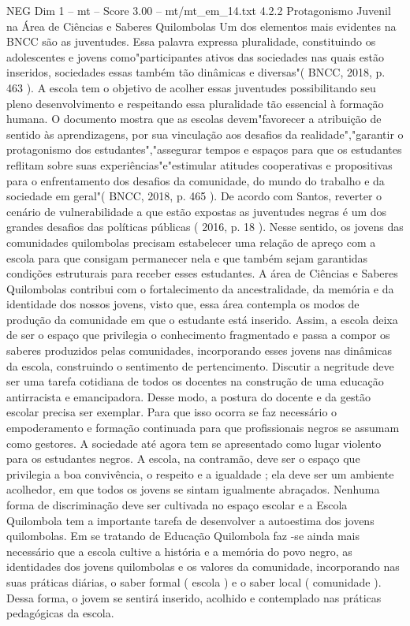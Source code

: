 \begin{textsample}{NEG Dim 1 – mt – Score 3.00 – mt/mt\_em\_14.txt}  \label{ex:f1_neg_216}
4.2.2 Protagonismo Juvenil na Área de Ciências e Saberes Quilombolas Um dos elementos mais evidentes na BNCC são as juventudes.
Essa palavra expressa pluralidade, constituindo os adolescentes e jovens como"participantes ativos das sociedades nas quais estão inseridos, sociedades essas também tão dinâmicas e diversas"( BNCC, 2018, p. 463 ).
A escola tem o objetivo de acolher essas juventudes possibilitando seu pleno desenvolvimento e respeitando essa pluralidade tão essencial à formação humana.
O documento mostra que as escolas devem"favorecer a atribuição de sentido às aprendizagens, por sua vinculação aos desafios da realidade","garantir o protagonismo dos estudantes","assegurar tempos e espaços para que os estudantes reflitam sobre suas experiências"e"estimular atitudes cooperativas e propositivas para o enfrentamento dos desafios da comunidade, do mundo do trabalho e da sociedade em geral"( BNCC, 2018, p. 465 ).
De acordo com Santos, reverter o cenário de vulnerabilidade a que estão expostas as juventudes negras é um dos grandes desafios das políticas públicas ( 2016, p. 18 ).
Nesse sentido, os jovens das comunidades quilombolas precisam estabelecer uma relação de apreço com a escola para que consigam permanecer nela e que também sejam garantidas condições estruturais para receber esses estudantes.
A área de Ciências e Saberes Quilombolas contribui com o fortalecimento da ancestralidade, da memória e da identidade dos nossos jovens, visto que, essa área contempla os modos de produção da comunidade em que o estudante está inserido.
Assim, a escola deixa de ser o espaço que privilegia o conhecimento fragmentado e passa a compor os saberes produzidos pelas comunidades, incorporando esses jovens nas dinâmicas da escola, construindo o sentimento de pertencimento.
Discutir a negritude deve ser uma tarefa cotidiana de todos os docentes na construção de uma educação antirracista e emancipadora.
Desse modo, a postura do docente e da gestão escolar precisa ser exemplar.
Para que isso ocorra se faz necessário o empoderamento e formação continuada para que profissionais negros se assumam como gestores.
A sociedade até agora tem se apresentado como lugar violento para os estudantes negros.
A escola, na contramão, deve ser o espaço que privilegia a boa convivência, o respeito e a igualdade ; ela deve ser um ambiente acolhedor, em que todos os jovens se sintam igualmente abraçados.
Nenhuma forma de discriminação deve ser cultivada no espaço escolar e a Escola Quilombola tem a importante tarefa de desenvolver a autoestima dos jovens quilombolas.
Em se tratando de Educação Quilombola faz -se ainda mais necessário que a escola cultive a história e a memória do povo negro, as identidades dos jovens quilombolas e os valores da comunidade, incorporando nas suas práticas diárias, o saber formal ( escola ) e o saber local ( comunidade ).
Dessa forma, o jovem se sentirá inserido, acolhido e contemplado nas práticas pedagógicas da escola.

\end{textsample}
